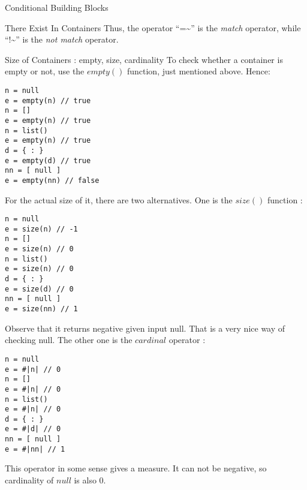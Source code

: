 \begin{section}{Conditional Building Blocks}
\begin{subsection}{There Exist In Containers}
Thus, the operator ``=\textasciitilde'' is the \emph{match} operator, while  ``!\textasciitilde'' is the \emph{not match} operator.

\end{subsection}

\begin{subsection}{Size of Containers : empty, size, cardinality}
To check whether a container is empty or not, 
use the $empty()$  function, just mentioned above. Hence:
\begin{center}\begin{minipage}{\linewidth}
\begin{lstlisting}[style=JexlStyle]
n = null
e = empty(n) // true 
n = []
e = empty(n) // true 
n = list()
e = empty(n) // true 
d = { : }
e = empty(d) // true 
nn = [ null ]
e = empty(nn) // false 
\end{lstlisting}
\end{minipage}\end{center}

For the actual size of it, there are two alternatives.
One is the $size()$   function :

\begin{center}\begin{minipage}{\linewidth}
\begin{lstlisting}[style=JexlStyle]
n = null
e = size(n) // -1 
n = []
e = size(n) // 0 
n = list()
e = size(n) // 0 
d = { : }
e = size(d) // 0 
nn = [ null ]
e = size(nn) // 1 
\end{lstlisting}
\end{minipage}\end{center}

Observe that it returns negative given input null. 
That is a very nice way of checking null.
The other one is the $cardinal$ operator :

\begin{center}\begin{minipage}{\linewidth}
\begin{lstlisting}[style=JexlStyle]
n = null
e = #|n| // 0 
n = []
e = #|n| // 0 
n = list()
e = #|n| // 0 
d = { : }
e = #|d| // 0 
nn = [ null ]
e = #|nn| // 1 
\end{lstlisting}
\end{minipage}\end{center}

This operator in some sense gives a measure. It can not be negative, 
so cardinality of $null$ is also 0. 
\end{subsection}


\end{section}
